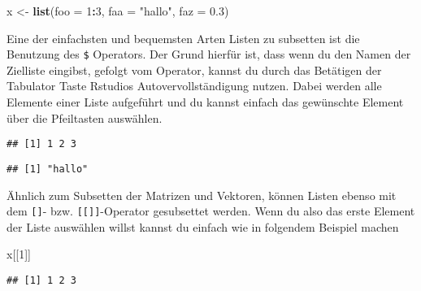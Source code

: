 \documentclass[
]{book}
\newenvironment{Shaded}{\begin{snugshade}}{\end{snugshade}}
\newcommand{\DataTypeTok}[1]{\textcolor[rgb]{0.13,0.29,0.53}{#1}}
\newcommand{\DecValTok}[1]{\textcolor[rgb]{0.00,0.00,0.81}{#1}}
\newcommand{\FloatTok}[1]{\textcolor[rgb]{0.00,0.00,0.81}{#1}}
\newcommand{\KeywordTok}[1]{\textcolor[rgb]{0.13,0.29,0.53}{\textbf{#1}}}
\newcommand{\NormalTok}[1]{#1}
\newcommand{\OperatorTok}[1]{\textcolor[rgb]{0.81,0.36,0.00}{\textbf{#1}}}
\newcommand{\StringTok}[1]{\textcolor[rgb]{0.31,0.60,0.02}{#1}}
\begin{document}
\begin{Shaded}
\begin{Highlighting}[]
\NormalTok{x <-}\StringTok{ }\KeywordTok{list}\NormalTok{(}\DataTypeTok{foo =} \DecValTok{1}\OperatorTok{:}\DecValTok{3}\NormalTok{, }\DataTypeTok{faa =} \StringTok{"hallo"}\NormalTok{, }\DataTypeTok{faz =} \FloatTok{0.3}\NormalTok{)}
\end{Highlighting}
\end{Shaded}

Eine der einfachsten und bequemsten Arten Listen zu subsetten ist die Benutzung des \texttt{\$} Operators. Der Grund hierfür ist, dass wenn du den Namen der Zielliste eingibst, gefolgt vom Operator, kannst du durch das Betätigen der Tabulator Taste Rstudios Autovervollständigung nutzen. Dabei werden alle Elemente einer Liste aufgeführt und du kannst einfach das gewünschte Element über die Pfeiltasten auswählen.

\begin{Shaded}
\end{Shaded}

\begin{verbatim}
## [1] 1 2 3
\end{verbatim}

\begin{Shaded}
\end{Shaded}

\begin{verbatim}
## [1] "hallo"
\end{verbatim}

Ähnlich zum Subsetten der Matrizen und Vektoren, können Listen ebenso mit dem \texttt{{[}{]}}- bzw. \texttt{{[}{[}{]}{]}}-Operator gesubsettet werden. Wenn du also das erste Element der Liste auswählen willst kannst du einfach wie in folgendem Beispiel machen

\begin{Shaded}
\begin{Highlighting}[]
\NormalTok{x[[}\DecValTok{1}\NormalTok{]]}
\end{Highlighting}
\end{Shaded}

\begin{verbatim}
## [1] 1 2 3
\end{verbatim}
\end{document}
